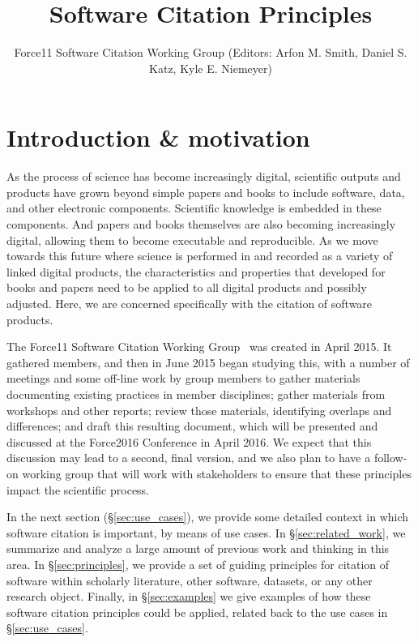 \documentclass[11pt, oneside]{amsart}
\title{Software Citation Principles}
\author{Force11 Software Citation Working Group (Editors: Arfon M. Smith, Daniel S. Katz, Kyle E. Niemeyer)}
\date{}
\begin{document}
\begin{abstract}
\end{abstract}

\maketitle


\section{Introduction \& motivation}
\label{sec:intro}

As the process of science has become increasingly digital, scientific outputs and products have
grown beyond simple papers and books to include software, data, and other electronic
components.  Scientific knowledge is embedded in these components.  And papers and books
themselves are also becoming increasingly digital, allowing them to become executable
and reproducible.  As we move towards this future where science is performed in and recorded
as a variety of linked digital products, the characteristics and properties that developed for
books and papers need to be applied to all digital products and possibly adjusted.  Here, we are concerned specifically
with the citation of software products.

The Force11 Software Citation Working Group~\cite{f11scwg} was created in April 2015.
It gathered members, and then in June 2015 began studying this, with a number of meetings
and some off-line work by group members to gather materials documenting existing
practices in member disciplines; gather materials from workshops and other reports;
review those materials, identifying overlaps and differences; and draft this resulting document,
which will be presented and discussed at the Force2016 Conference \cite{force2016}
in April 2016.  We expect that
this discussion may lead to a second, final version, and we also
plan to have a follow-on working group that will work with stakeholders to ensure that
these principles impact the scientific process.

In the next section (\S\ref{sec:use_cases}), we provide some detailed context in which
software citation is important, by means of use cases.  In \S\ref{sec:related_work}, we
summarize and analyze a large amount of previous work and thinking in this area.  In
\S\ref{sec:principles}, we provide a set of guiding principles for citation of software within
scholarly literature, other software, datasets, or any other research object.  Finally,
in \S\ref{sec:examples} we give examples of how these software citation principles
could be applied, related back to the use cases in \S\ref{sec:use_cases}.
\end{document}
